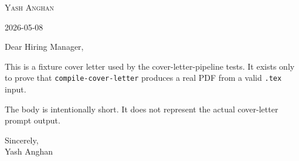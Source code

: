 \documentclass[letterpaper,11pt]{article}
\begin{document}
\begin{center}
{\Huge \scshape Yash Anghan}
\end{center}
\hfill 2026-05-08

Dear Hiring Manager,\par\vspace{6pt}
This is a fixture cover letter used by the cover-letter-pipeline tests. It exists only to prove that \texttt{compile-cover-letter} produces a real PDF from a valid \texttt{.tex} input.\par\vspace{6pt}
The body is intentionally short. It does not represent the actual cover-letter prompt output.\par\vspace{6pt}
Sincerely,\\ Yash Anghan
\end{document}

